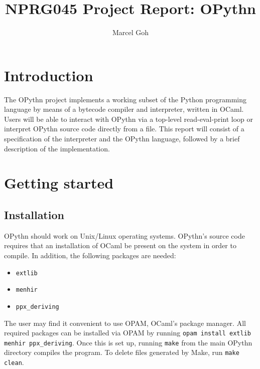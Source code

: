 \documentclass[11pt, twoside]{article}
\newcommand{\ms}{\texttt}
\begin{document}
\title{\Huge{\textbf{NPRG045 Project Report: OPythn}}}
\author{\Large{Marcel Goh}}
\clearpage\maketitle
\thispagestyle{empty}
\newpage
\setcounter{page}{1}

\section{Introduction}
    The OPythn project implements a working subset of the Python programming language by means of a bytecode compiler and interpreter, written in OCaml. Users will be able to interact with OPythn via a top-level read-eval-print loop or interpret OPythn source code directly from a file. This report will consist of a specification of the interpreter and the OPythn language, followed by a brief description of the implementation.

\section{Getting started}
    \subsection{Installation}
    OPythn should work on Unix/Linux operating systems. OPythn's source code requires that an installation of OCaml be present on the system in order to compile. In addition, the following packages are needed:
    \begin{itemize}
        \item \ms{extlib}
        \item \ms{menhir}
        \item \ms{ppx\_deriving}
    \end{itemize}
    The user may find it convenient to use OPAM, OCaml's package manager. All required packages can be installed via OPAM by running \ms{opam install extlib menhir ppx\_deriving}. Once this is set up, running \ms{make} from the main OPythn directory compiles the program. To delete files generated by Make, run \ms{make clean}.
\end{document}
